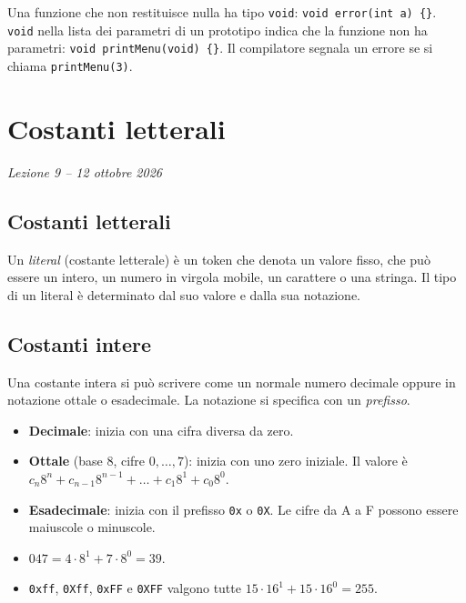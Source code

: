 \documentclass[11pt,a4paper]{article}
\begin{document}
Una funzione che non restituisce nulla ha tipo \lstinline|void|:
\lstinline|void error(int a) {}|. \lstinline|void| nella lista dei parametri di un
prototipo indica che la funzione non ha parametri:
\lstinline|void printMenu(void) {}|. Il compilatore segnala un errore se si
chiama \lstinline|printMenu(3)|.

\section[Costanti letterali (Lezione 9 -- 12 ottobre 2026)]{Costanti letterali}
\noindent\emph{Lezione 9 -- 12 ottobre 2026}
\subsection{Costanti letterali}

\begin{definizione}
Un \emph{literal} (costante letterale) è un token che denota un valore fisso, che può essere un intero, un numero in virgola mobile, un carattere o una stringa. Il tipo di un literal è determinato dal suo valore e dalla sua notazione.
\end{definizione}

\subsection{Costanti intere}

Una costante intera si può scrivere come un normale numero decimale oppure in notazione ottale o esadecimale. La notazione si specifica con un \emph{prefisso}.

\begin{itemize}
    \item \textbf{Decimale}: inizia con una cifra diversa da zero.
    \item \textbf{Ottale} (base 8, cifre $0, \dots, 7$): inizia con uno zero iniziale. Il valore è $c_n 8^n + c_{n-1} 8^{n-1} + \dots + c_1 8^1 + c_0 8^0$.
    \item \textbf{Esadecimale}: inizia con il prefisso \lstinline|0x| o \lstinline|0X|. Le cifre da A a F possono essere maiuscole o minuscole.
\end{itemize}

\begin{esempio}
\leavevmode
\begin{itemize}
    \item $047 = 4 \cdot 8^1 + 7 \cdot 8^0 = 39$.
    \item \lstinline|0xff|, \lstinline|0Xff|, \lstinline|0xFF| e \lstinline|0XFF| valgono tutte $15 \cdot 16^1 + 15 \cdot 16^0 = 255$.
\end{itemize}
\end{esempio}
\end{document}
